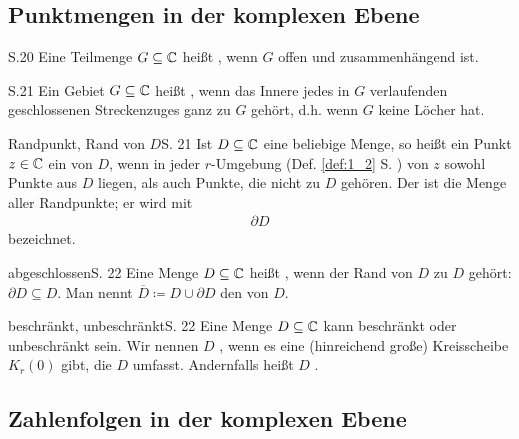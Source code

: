 \subsection{Punktmengen in der komplexen Ebene}

\begin{definition}[Gebiet]{S.20}
  Eine Teilmenge $G \subseteq \mathbb{C}$ heißt , wenn $G$ offen und zusammenhängend ist.
\end{definition}

\begin{definition}{S.21}
  Ein Gebiet $G \subseteq \mathbb{C}$ heißt , wenn das Innere jedes in $G$ verlaufenden geschlossenen Streckenzuges ganz zu $G$ gehört, d.h. wenn $G$ keine Löcher hat.
\end{definition}

\begin{bemerkung}{Randpunkt, Rand von $D$}{S. 21}
  Ist $D \subseteq \mathbb{C}$ eine beliebige Menge, so heißt ein Punkt $z \in \mathbb{C}$ ein  von $D$, wenn in jeder $r$-Umgebung (Def. \ref{def:1_2} S. \pageref{def:1_2}) von $z$ sowohl Punkte aus $D$ liegen, als auch Punkte, die nicht zu $D$ gehören.
  Der  ist die Menge aller Randpunkte; er wird mit
  \begin{align}
    \partial D
  \end{align}
  bezeichnet.
\end{bemerkung}

\begin{bemerkung}{abgeschlossen}{S. 22}
  Eine Menge $D \subseteq \mathbb{C}$ heißt , wenn der Rand von $D$ zu $D$ gehört: $\partial D \subseteq D$.
  Man nennt $\overline{D} \coloneqq D \cup \partial D$ den  von $D$.
\end{bemerkung}

\begin{bemerkung}{beschränkt, unbeschränkt}{S. 22}
  Eine Menge $D \subseteq \mathbb{C}$ kann beschränkt oder unbeschränkt sein.
  Wir nennen $D$ , wenn es eine (hinreichend große) Kreisscheibe $K_r(0)$ gibt, die $D$ umfasst.
  Andernfalls heißt $D$ .
\end{bemerkung}



\subsection{Zahlenfolgen in der komplexen Ebene}

